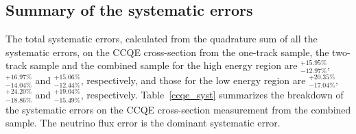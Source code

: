 \documentclass[%
 reprint,
superscriptaddress,
 amsmath,amssymb,
 aps,
]{revtex4-1}
\begin{document}
\subsection{Summary of the systematic errors}
The total systematic errors, calculated from the quadrature sum of all the systematic errors,
on the CCQE cross-section from the one-track sample, the two-track sample and the combined sample for the high energy region are $_{-12.97\%}^{+15.95\%}$, $_{-14.04\%}^{+16.97\%}$ and $_{-12.44\%}^{+15.06\%}$, respectively, and those for the low energy region are $_{-17.04\%}^{+20.35\%}$, $_{-18.86\%}^{+24.20\%}$ and $_{-15.49\%}^{+19.04\%}$, respectively.
Table~\ref{ccqe_syst} summarizes the breakdown of the systematic errors on the CCQE cross-section measurement from the combined sample.
The neutrino flux error is the dominant systematic error.
\end{document}
